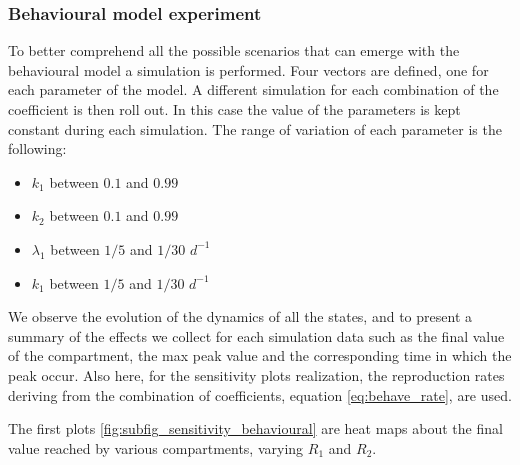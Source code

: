 \subsubsection{Behavioural model experiment}
To better comprehend all the possible scenarios that can emerge with the behavioural model a simulation is performed. Four vectors are defined, one for each parameter of the model. A different simulation for each combination of the coefficient is then roll out. In this case the value of the parameters is kept constant during each simulation.
The range of variation of each parameter is the following:
\begin{itemize}
	\item $k_1$ between $0.1$ and $0.99$
	\item $k_2$ between $0.1$ and $0.99$
	\item $\lambda_1$ between $1/5$ and $1/30$ $d^{-1}$
	\item $k_1$ between $1/5$ and $1/30$ $d^{-1}$
\end{itemize}
We observe the evolution of the dynamics of all the states, and to present a summary of the effects we collect for each simulation data such as the final value of the compartment, the max peak value and the corresponding time in which the peak occur. 
Also here, for the sensitivity plots realization, the reproduction rates deriving from the combination of coefficients, equation \eqref{eq:behave_rate}, are used. 

The first plots \ref{fig:subfig_sensitivity_behavioural} are heat maps about the final value reached by various compartments, varying $R_1$ and $R_2$.

